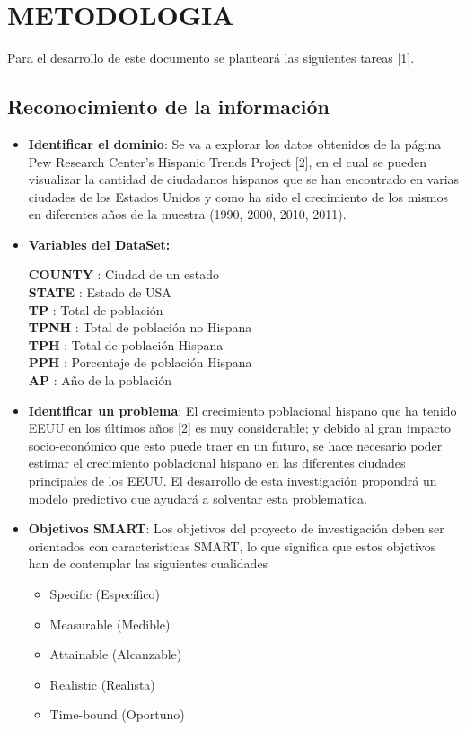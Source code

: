 \section{METODOLOGIA}

 Para el desarrollo de este documento se planteará las siguientes tareas [1].
 
  \subsection{Reconocimiento de la información}
 
  \begin{itemize}
   \item \textbf{Identificar el dominio}: Se va a explorar los datos obtenidos de la página Pew Research Center’s Hispanic Trends Project [2], en el cual se pueden visualizar la cantidad de ciudadanos hispanos que se han encontrado en varias ciudades de los Estados Unidos y como ha sido el crecimiento de los mismos en diferentes años de la muestra (1990, 2000, 2010, 2011).\\
   
   \item \textbf{Variables del DataSet:}
    	 
   	\textbf{COUNTY} : Ciudad de un estado\\ 
    \textbf{STATE} 	: Estado de USA\\
   	\textbf{TP} 	: Total de población\\
   	\textbf{TPNH} 	: Total de población no Hispana\\
   	\textbf{TPH} 	: Total de población Hispana\\
   	\textbf{PPH} 	: Porcentaje de población Hispana\\
   	\textbf{AP} 	: Año de la población\\
   	
 
    \item \textbf{Identificar un problema}: El crecimiento poblacional hispano que ha tenido EEUU en los últimos años [2] es muy considerable; y debido al gran impacto socio-económico que esto puede traer en un futuro, se hace necesario poder estimar el crecimiento poblacional hispano en las diferentes ciudades principales de los EEUU. El desarrollo de esta investigación propondrá un modelo predictivo que ayudará a solventar esta problematica.\\ 
    
   \item \textbf{Objetivos SMART}: Los objetivos del proyecto de investigación deben ser orientados con caracteristicas SMART, lo que significa que estos objetivos han de contemplar las siguientes cualidades
    \begin{itemize}
     \item Specific  (Específico)
     \item Measurable (Medible)
     \item Attainable (Alcanzable)
     \item Realistic (Realista)
     \item Time-bound (Oportuno)               
    \end{itemize}
  \end{itemize}
